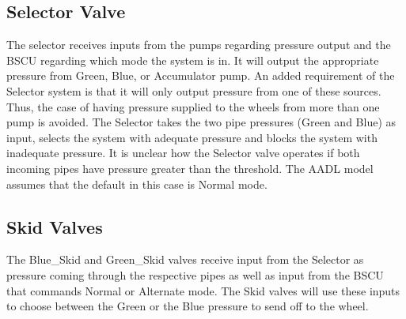 \subsection{Selector Valve}
The selector receives inputs from the pumps regarding pressure output and the BSCU regarding which mode the system is in. It will output the appropriate pressure from Green, Blue, or Accumulator pump. An added requirement of the Selector system is that it will only output pressure from one of these sources. Thus, the case of having pressure supplied to the wheels from more than one pump is avoided. The Selector takes the two pipe pressures (Green and Blue) as input, selects the system with adequate pressure and blocks the system with inadequate pressure. It is unclear how the Selector valve operates if both incoming pipes have pressure greater than the threshold. The AADL model assumes that the default in this case is Normal mode. 

\subsection{Skid Valves}
The Blue\_Skid and Green\_Skid valves receive input from the Selector as pressure coming through the respective pipes as well as input from the BSCU that commands Normal or Alternate mode. The Skid valves will use these inputs to choose between the Green or the Blue pressure to send off to the wheel. 



